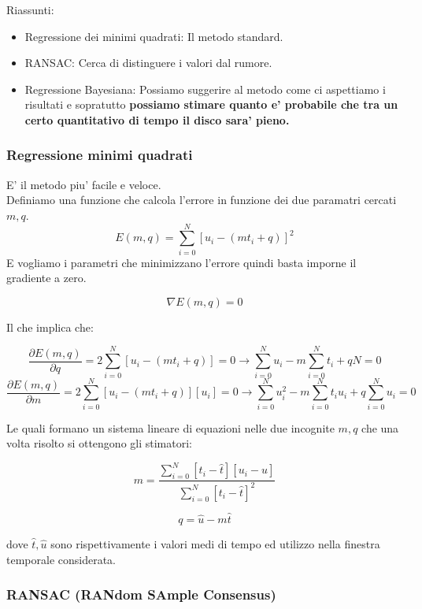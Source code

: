 \documentclass{article}
\begin{document}
Riassunti:
\begin{itemize}
    \item Regressione dei minimi quadrati: Il metodo standard.
    \item RANSAC: Cerca di distinguere i valori dal rumore.
    \item Regressione Bayesiana: Possiamo suggerire al metodo come ci aspettiamo i risultati e sopratutto \textbf{possiamo stimare quanto e' probabile che tra un certo quantitativo di tempo il disco sara' pieno.}
\end{itemize}

\clearpage

\subsubsection{Regressione minimi quadrati}
E' il metodo piu' facile e veloce.\\
Definiamo una funzione che calcola l'errore in funzione dei due paramatri cercati \(m, q\).
\[E(m, q) = \sum_{i = 0}^N \left[u_i - (m t_i + q)\right]^2\]
E vogliamo i parametri che minimizzano l'errore quindi basta imporne il gradiente a zero.

\[\nabla E(m, q) = 0\]

Il che implica che:

\[\frac{\partial E(m, q)}{\partial q} = 2\sum_{i = 0}^N \left[u_i - (m t_i + q)\right] = 0 \rightarrow  \sum_{i = 0}^N u_i - m \sum_{i = 0}^N t_i + q N = 0\]
\[\frac{\partial E(m, q)}{\partial m} = 2\sum_{i = 0}^N \left[u_i - (m t_i + q)\right] \left[u_i\right] = 0 \rightarrow \sum_{i = 0}^N u_i^2 - m \sum_{i = 0}^N t_i u_i + q\sum_{i = 0}^N u_i =  0\]

Le quali formano un sistema lineare di equazioni nelle due incognite \(m, q\) che una volta risolto si ottengono gli stimatori:

\[m = \frac{\sum_{i = 0}^N \left[t_i - \hat{t}\right]\left[u_i - \hat{u}\right]}{\sum_{i = 0}^N \left[t_i - \hat{t}\right]^2}\]

\[q = \hat{u} - m \hat{t} \]

dove \(\hat{t}, \hat{u}\) sono rispettivamente i valori medi di tempo ed utilizzo nella finestra temporale considerata.


\subsubsection{RANSAC (RANdom SAmple Consensus)}
\end{document}
